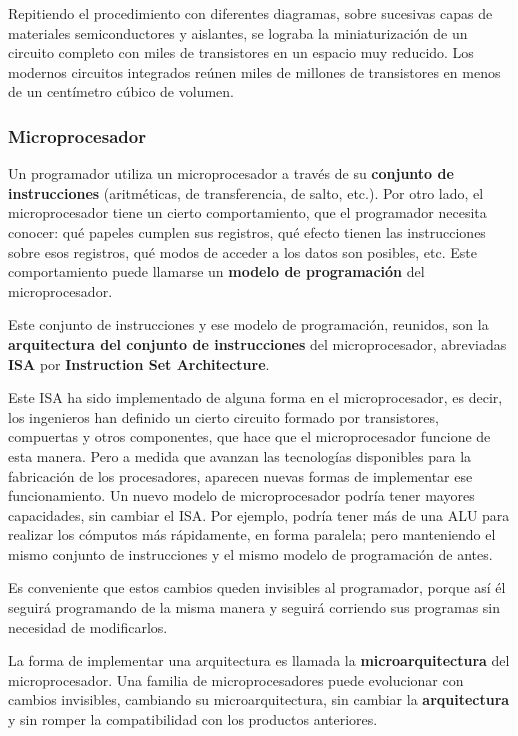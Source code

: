 \documentclass[spanish,A4,]{article}
\begin{document}
Repitiendo el procedimiento con diferentes diagramas, sobre sucesivas
capas de materiales semiconductores y aislantes, se lograba la
miniaturización de un circuito completo con miles de transistores en un
espacio muy reducido. Los modernos circuitos integrados reúnen miles de
millones de transistores en menos de un centímetro cúbico de volumen.

\subsubsection{Microprocesador}\label{microprocesador}

Un programador utiliza un microprocesador a través de su
\textbf{conjunto de instrucciones} (aritméticas, de transferencia, de
salto, etc.). Por otro lado, el microprocesador tiene un cierto
comportamiento, que el programador necesita conocer: qué papeles cumplen
sus registros, qué efecto tienen las instrucciones sobre esos registros,
qué modos de acceder a los datos son posibles, etc. Este comportamiento
puede llamarse un \textbf{modelo de programación} del microprocesador.

Este conjunto de instrucciones y ese modelo de programación, reunidos,
son la \textbf{arquitectura del conjunto de instrucciones} del
microprocesador, abreviadas \textbf{ISA} por \textbf{Instruction Set
Architecture}.

Este ISA ha sido implementado de alguna forma en el microprocesador, es
decir, los ingenieros han definido un cierto circuito formado por
transistores, compuertas y otros componentes, que hace que el
microprocesador funcione de esta manera. Pero a medida que avanzan las
tecnologías disponibles para la fabricación de los procesadores,
aparecen nuevas formas de implementar ese funcionamiento. Un nuevo
modelo de microprocesador podría tener mayores capacidades, sin cambiar
el ISA. Por ejemplo, podría tener más de una ALU para realizar los
cómputos más rápidamente, en forma paralela; pero manteniendo el mismo
conjunto de instrucciones y el mismo modelo de programación de antes.

Es conveniente que estos cambios queden invisibles al programador,
porque así él seguirá programando de la misma manera y seguirá corriendo
sus programas sin necesidad de modificarlos.

La forma de implementar una arquitectura es llamada la
\textbf{microarquitectura} del microprocesador. Una familia de
microprocesadores puede evolucionar con cambios invisibles, cambiando su
microarquitectura, sin cambiar la \textbf{arquitectura} y sin romper la
compatibilidad con los productos anteriores.
\end{document}
